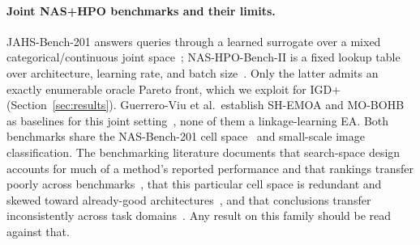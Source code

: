 \paragraph{Joint NAS+HPO benchmarks and their limits.} JAHS-Bench-201 answers queries through a learned surrogate
over a mixed categorical/continuous joint space~\citep{bansal2022jahsbench}; NAS-HPO-Bench-II is a fixed lookup
table over architecture, learning rate, and batch size~\citep{hirose2021nashpobenchii}. Only the latter admits an
exactly enumerable oracle Pareto front, which we exploit for IGD+ (Section~\ref{sec:results}). Guerrero-Viu et
al.\ establish SH-EMOA and MO-BOHB as baselines for this joint setting~\citep{guerreroviu2021bagofbaselines}, none
of them a linkage-learning EA. Both benchmarks share the NAS-Bench-201 cell space~\citep{dong2020nasbench201} and
small-scale image classification. The benchmarking literature documents that search-space design accounts for
much of a method's reported performance and that rankings transfer poorly across
benchmarks~\citep{yang2020nasfrustratinglyhard,mehta2022nasbenchsuite}, that this particular cell space is
redundant and skewed toward already-good architectures~\citep{lopes2023nasbenchdesign}, and that conclusions
transfer inconsistently across task domains~\citep{tu2022nasbench360,duan2021transnasbench101}. Any result on
this family should be read against that.
